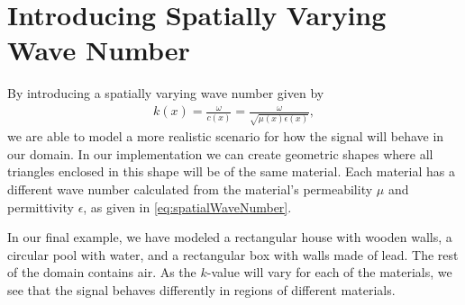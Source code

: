 \documentclass[10pt,a4paper]{article}
\begin{document}
\section*{Introducing Spatially Varying Wave Number}
By introducing a spatially varying wave number given by
\begin{align}\label{eq:spatialWaveNumber}
k(x) = \frac{\omega}{c(x)} = \frac{\omega}{\sqrt{\mu(x)\epsilon(x)}},
\end{align}
we are able to model a more realistic scenario for how the signal will behave in our domain. In our implementation we can create geometric shapes where all triangles enclosed in this shape will be of the same material. Each material has a different wave number calculated from the material's permeability $\mu$ and permittivity $\epsilon$, as given in \eqref{eq:spatialWaveNumber}.

In our final example, we have modeled a rectangular house with wooden walls, a circular pool with water, and a rectangular box with walls made of lead. The rest of the domain contains air. As the $k$-value will vary for each of the materials, we see that the signal behaves differently in regions of different materials.
\end{document}
